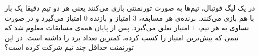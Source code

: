 \EXERCISE
در یک لیگ فوتبال، تیم‌ها به صورت تورنمنتی بازی می‌کنند یعنی هر دو تیم دقیقا یک بار با هم بازی می‌کنند. برنده‌ی هر مسابقه،
$3$
امتیاز و بازنده
$0$
امتیاز می‌گیرد و در صورت تساوی به هر تیم،
$1$
امتیاز تعلق می‌گیرد. پس از پایان همه‌ی مسابقات معلوم شد که تیمی که بیش‌ترین امتیاز را کسب کرده، کمترین تعداد برد را داشته است. در این تورنمنت حداقل چند تیم شرکت کرده است؟
